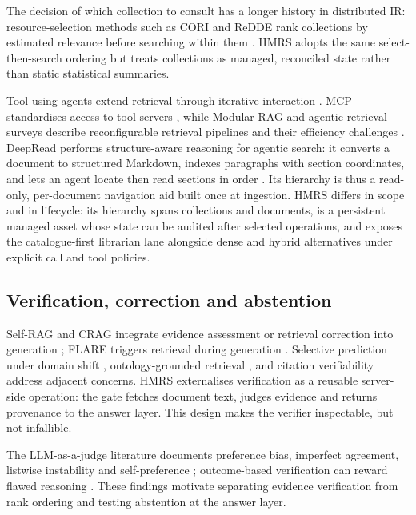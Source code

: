 The decision of which collection to consult has a longer history in
distributed IR: resource-selection methods such as CORI and ReDDE rank
collections by estimated relevance before searching within them
\citep{callan1995searching,si2003redde}. HMRS adopts the same
select-then-search ordering but treats collections as managed, reconciled
state rather than static statistical summaries.

Tool-using agents extend retrieval through iterative interaction
\citep{react-yao,toolformer}. MCP standardises access to tool servers
\citep{mcp}, while Modular RAG and agentic-retrieval surveys describe
reconfigurable retrieval pipelines and their efficiency challenges
\citep{modular-rag,singh-agentic-rag}. DeepRead performs structure-aware
reasoning for agentic search: it converts a document to structured Markdown,
indexes paragraphs with section coordinates, and lets an agent locate then
read sections in order \citep{deepread}. Its hierarchy is thus a read-only,
per-document navigation aid built once at ingestion. HMRS differs in scope
and in lifecycle: its hierarchy spans collections and documents, is a
persistent managed asset whose state can be audited after selected operations, and exposes the
catalogue-first librarian lane alongside dense and hybrid alternatives under
explicit call and tool policies.

\subsection{Verification, correction and abstention}
Self-RAG and CRAG integrate evidence assessment or retrieval correction into
generation \citep{selfrag,crag}; FLARE triggers retrieval during generation
\citep{flare}. Selective prediction under domain shift \citep{kamath},
ontology-grounded retrieval \citep{cyberbot}, and citation verifiability
\citep{liu-verifiability,gao-citations} address adjacent concerns. HMRS externalises
verification as a reusable server-side operation: the gate fetches document
text, judges evidence and returns provenance to the answer layer. This design
makes the verifier inspectable, but not infallible.

The LLM-as-a-judge literature documents preference bias, imperfect agreement,
listwise instability and self-preference \citep{zheng-llmjudge,sun-urara,panickssery-selfpref}; outcome-based verification can reward flawed reasoning
\citep{lightman-verify}. These findings motivate separating evidence
verification from rank ordering and testing abstention at the answer layer.

